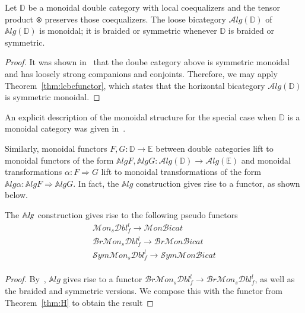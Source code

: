 \begin{prop}\label{thm:eqcomp}
Let $\mathbb{D}$ be a monoidal double category with local coequalizers and the tensor product $\otimes$ preserves those coequalizers. The loose bicategory $\mathcal{A}lg(\mathbb{D})$ of $\mathbb{A}lg(\mathbb{D})$ is monoidal; it is braided or symmetric whenever $\mathbb{D}$ is braided or symmetric.
\end{prop}

\begin{proof}
It was shown in~\cite[]{shulman:frbi} that the doube category above is symmetric monoidal and has loosely strong companions and conjoints. Therefore, we may apply Theorem~\ref{thm:lcbcfunctor}, which states that the horizontal bicategory $\mathcal{A}lg(\mathbb{D})$ is symmetric monoidal.
\end{proof}


An explicit description of the monoidal structure for the special case when ${\mathbb{D}}$ is a monoidal category was given in~\cite{westerthesis}. 

Similarly, monoidal functors $F,G:\mathbb{D} \rightarrow \mathbb{E}$ between double categories lift to monoidal functors of the form $\mathbb{A}lgF,\mathbb{A}lgG: \mathcal{A}lg(\mathbb{D}) \rightarrow \mathcal{A}lg(\mathbb{E})$ and monoidal transformations $\alpha: F \Rightarrow G$ lift to monoidal transformations of the form $\mathbb{A}lg\alpha: \mathbb{A}lgF \Rightarrow \mathbb{A}lgG$. In fact, the $\mathbb{A}lg$ construction gives rise to a functor, as shown below. 

\begin{prop}\label{prop:funcAlg}
The $\mathbb{A}\mathit{lg}$ construction gives rise to the following pseudo functors
\begin{align*}
\mathcal{M}on_s\mathcal{D}bl^l _f\rightarrow \mathcal{M}on\mathcal{B}icat\\
\mathcal{B}r\mathcal{M}on_s\mathcal{D}bl^l_f \rightarrow \mathcal{B}r\mathcal{M}on\mathcal{B}icat\\
\mathcal{S}ym\mathcal{M}on_s\mathcal{D}bl^l_f \rightarrow \mathcal{S}ym\mathcal{M}on\mathcal{B}icat\\
\end{align*}
\end{prop}

\begin{proof}
By~\cite[Proposition11.22]{shulman:frbi}, $\mathbb{A}lg$ gives rise to a functor $\mathcal{B}r\mathcal{M}on_s\mathcal{D}bl_f^l \rightarrow \mathcal{B}r\mathcal{M}on_s \mathcal{D}bl_f^l$, as well as the braided and symmetric versions. We compose this with the functor from Theorem~\ref{thm:H} to obtain the result
\end{proof}

